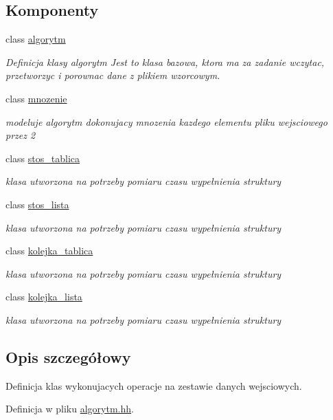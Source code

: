 \subsection*{\-Komponenty}
\begin{DoxyCompactItemize}
\item 
class \hyperlink{classalgorytm}{algorytm}
\begin{DoxyCompactList}\small\item\em \-Definicja klasy algorytm \-Jest to klasa bazowa, ktora ma za zadanie wczytac, przetworzyc i porownac dane z plikiem wzorcowym. \end{DoxyCompactList}\item 
class \hyperlink{classmnozenie}{mnozenie}
\begin{DoxyCompactList}\small\item\em modeluje algorytm dokonujacy mnozenia kazdego elementu pliku wejsciowego przez 2 \end{DoxyCompactList}\item 
class \hyperlink{classstos__tablica}{stos\-\_\-tablica}
\begin{DoxyCompactList}\small\item\em klasa utworzona na potrzeby pomiaru czasu wypełnienia struktury \end{DoxyCompactList}\item 
class \hyperlink{classstos__lista}{stos\-\_\-lista}
\begin{DoxyCompactList}\small\item\em klasa utworzona na potrzeby pomiaru czasu wypełnienia struktury \end{DoxyCompactList}\item 
class \hyperlink{classkolejka__tablica}{kolejka\-\_\-tablica}
\begin{DoxyCompactList}\small\item\em klasa utworzona na potrzeby pomiaru czasu wypełnienia struktury \end{DoxyCompactList}\item 
class \hyperlink{classkolejka__lista}{kolejka\-\_\-lista}
\begin{DoxyCompactList}\small\item\em klasa utworzona na potrzeby pomiaru czasu wypełnienia struktury \end{DoxyCompactList}\end{DoxyCompactItemize}


\subsection{\-Opis szczegółowy}
\-Definicja klas wykonujacych operacje na zestawie danych wejsciowych. 

\-Definicja w pliku \hyperlink{algorytm_8hh_source}{algorytm.\-hh}.

